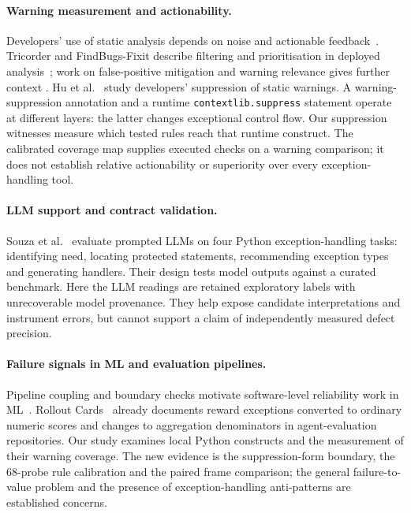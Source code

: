 \documentclass[10pt,a4paper]{article}
\let\cite\citep
\begin{document}
\paragraph{Warning measurement and actionability.}
Developers' use of static analysis depends on noise and actionable
feedback~\cite{johnson2013,ruthruff2008,do2022,yedida2023}.
Tricorder and FindBugs-Fixit describe filtering and prioritisation in
deployed analysis~\cite{sadowski2015,ayewah2010,sadowski2018}; work on
false-positive mitigation and warning relevance gives further context
\cite{guo2023,querel2018}.
Hu et al.~\cite{hu2025suppressed} study developers' suppression of static
warnings. A warning-suppression annotation and a runtime
\texttt{contextlib.suppress} statement operate at different layers:
the latter changes exceptional control flow. Our suppression witnesses
measure which tested rules reach that runtime construct.
The calibrated coverage map supplies executed checks on a warning
comparison; it does not establish relative actionability or superiority
over every exception-handling tool.

\paragraph{LLM support and contract validation.}
Souza et al.~\cite{souza2026llm} evaluate prompted LLMs on four Python
exception-handling tasks: identifying need, locating protected statements,
recommending exception types and generating handlers. Their design tests
model outputs against a curated benchmark. Here the LLM readings are
retained exploratory labels with unrecoverable model provenance.
They help expose candidate interpretations and instrument errors, but
cannot support a claim of independently measured defect precision.

\paragraph{Failure signals in ML and evaluation pipelines.}
Pipeline coupling and boundary checks motivate software-level reliability
work in ML~\cite{sculley2015,polyzotis2019,breck2017,amershi2019,paleyes2022,sambasivan2021}.
Rollout Cards~\cite{masters2026rolloutcards} already documents reward
exceptions converted to ordinary numeric scores and changes to
aggregation denominators in agent-evaluation repositories. Our study
examines local Python constructs and the measurement of their warning
coverage. The new evidence is the suppression-form boundary, the
68-probe rule calibration and the paired frame comparison; the general
failure-to-value problem and the presence of exception-handling
anti-patterns are established concerns.
\end{document}
